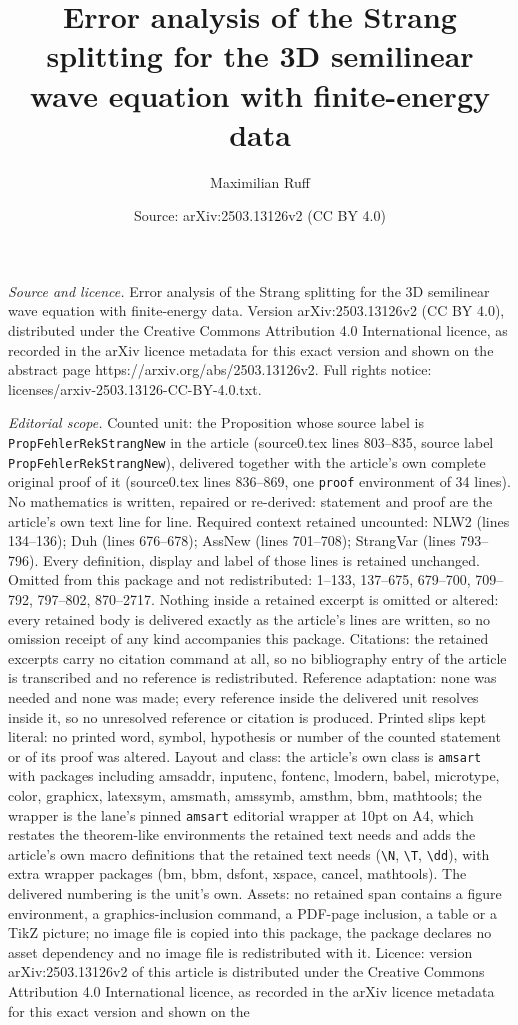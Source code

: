 \documentclass[10pt,a4paper]{amsart}
\title[Error analysis of the Strang splitting for the 3D semilinear]{Error analysis of the Strang splitting for the 3D semilinear wave equation with finite-energy data}
\author{Maximilian Ruff}
\date{Source: arXiv:2503.13126v2 (CC BY 4.0)}
\begin{document}
\maketitle

\noindent\emph{Source and licence.} Error analysis of the Strang splitting for the 3D semilinear wave equation with finite-energy data. Version arXiv:2503.13126v2 (CC BY 4.0), distributed under the Creative Commons Attribution 4.0 International licence, as recorded in the arXiv licence metadata for this exact version and shown on the abstract page https://arxiv.org/abs/2503.13126v2. Full rights notice: licenses/arxiv-2503.13126-CC-BY-4.0.txt.\par\smallskip

\noindent\textit{Editorial scope.} Counted unit: the Proposition whose source label is \texttt{PropFehlerRekStrangNew} in the article (source0.tex lines 803--835, source label \texttt{PropFehlerRekStrangNew}), delivered together with the article's own complete original proof of it (source0.tex lines 836--869, one \texttt{proof} environment of 34 lines). No mathematics is written, repaired or re-derived: statement and proof are the article's own text line for line. Required context retained uncounted: NLW2 (lines 134--136); Duh (lines 676--678); AssNew (lines 701--708); StrangVar (lines 793--796). Every definition, display and label of those lines is retained unchanged. Omitted from this package and not redistributed: 1--133, 137--675, 679--700, 709--792, 797--802, 870--2717. Nothing inside a retained excerpt is omitted or altered: every retained body is delivered exactly as the article's lines are written, so no omission receipt of any kind accompanies this package. Citations: the retained excerpts carry no citation command at all, so no bibliography entry of the article is transcribed and no reference is redistributed. Reference adaptation: none was needed and none was made; every reference inside the delivered unit resolves inside it, so no unresolved reference or citation is produced. Printed slips kept literal: no printed word, symbol, hypothesis or number of the counted statement or of its proof was altered. Layout and class: the article's own class is \texttt{amsart} with packages including amsaddr, inputenc, fontenc, lmodern, babel, microtype, color, graphicx, latexsym, amsmath, amssymb, amsthm, bbm, mathtools; the wrapper is the lane's pinned \texttt{amsart} editorial wrapper at 10pt on A4, which restates the theorem-like environments the retained text needs and adds the article's own macro definitions that the retained text needs (\texttt{\textbackslash N}, \texttt{\textbackslash T}, \texttt{\textbackslash dd}), with extra wrapper packages (bm, bbm, dsfont, xspace, cancel, mathtools). The delivered numbering is the unit's own. Assets: no retained span contains a figure environment, a graphics-inclusion command, a PDF-page inclusion, a table or a TikZ picture; no image file is copied into this package, the package declares no asset dependency and no image file is redistributed with it. Licence: version arXiv:2503.13126v2 of this article is distributed under the Creative Commons Attribution 4.0 International licence, as recorded in the arXiv licence metadata for this exact version and shown on the 
\end{document}

